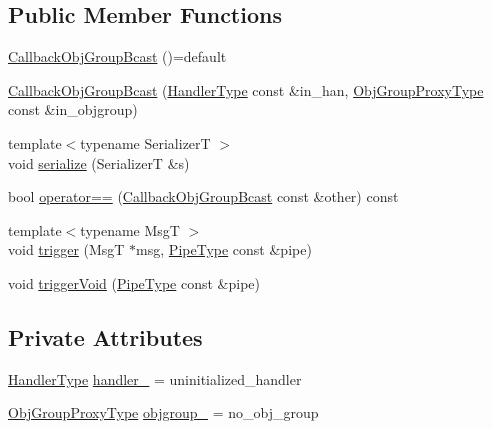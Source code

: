 \subsection*{Public Member Functions}
\begin{DoxyCompactItemize}
\item 
\hyperlink{structvt_1_1pipe_1_1callback_1_1_callback_obj_group_bcast_a8561b655015ff3b5babf80e95f224727}{Callback\+Obj\+Group\+Bcast} ()=default
\item 
\hyperlink{structvt_1_1pipe_1_1callback_1_1_callback_obj_group_bcast_aec9ccc1923795df3108b22e2a96e60b2}{Callback\+Obj\+Group\+Bcast} (\hyperlink{namespacevt_af64846b57dfcaf104da3ef6967917573}{Handler\+Type} const \&in\+\_\+han, \hyperlink{namespacevt_ad7cae989df485fccca57f0792a880a8e}{Obj\+Group\+Proxy\+Type} const \&in\+\_\+objgroup)
\item 
{\footnotesize template$<$typename SerializerT $>$ }\\void \hyperlink{structvt_1_1pipe_1_1callback_1_1_callback_obj_group_bcast_aa54227732bb00239a126c34c78aba5fb}{serialize} (SerializerT \&s)
\item 
bool \hyperlink{structvt_1_1pipe_1_1callback_1_1_callback_obj_group_bcast_a45c2e760843a416992e2a85c265136c7}{operator==} (\hyperlink{structvt_1_1pipe_1_1callback_1_1_callback_obj_group_bcast}{Callback\+Obj\+Group\+Bcast} const \&other) const
\item 
{\footnotesize template$<$typename MsgT $>$ }\\void \hyperlink{structvt_1_1pipe_1_1callback_1_1_callback_obj_group_bcast_aa39774bf2c1e2eeebf19339ad06253c8}{trigger} (MsgT $\ast$msg, \hyperlink{namespacevt_ac9852acda74d1896f48f406cd72c7bd3}{Pipe\+Type} const \&pipe)
\item 
void \hyperlink{structvt_1_1pipe_1_1callback_1_1_callback_obj_group_bcast_ab1a7563aa18693946506a66506f94671}{trigger\+Void} (\hyperlink{namespacevt_ac9852acda74d1896f48f406cd72c7bd3}{Pipe\+Type} const \&pipe)
\end{DoxyCompactItemize}
\subsection*{Private Attributes}
\begin{DoxyCompactItemize}
\item 
\hyperlink{namespacevt_af64846b57dfcaf104da3ef6967917573}{Handler\+Type} \hyperlink{structvt_1_1pipe_1_1callback_1_1_callback_obj_group_bcast_aff3713d579f1311e327ec933ec0463a9}{handler\+\_\+} = uninitialized\+\_\+handler
\item 
\hyperlink{namespacevt_ad7cae989df485fccca57f0792a880a8e}{Obj\+Group\+Proxy\+Type} \hyperlink{structvt_1_1pipe_1_1callback_1_1_callback_obj_group_bcast_a69a866eae9abf12ca0b60c9158c82a20}{objgroup\+\_\+} = no\+\_\+obj\+\_\+group
\end{DoxyCompactItemize}


